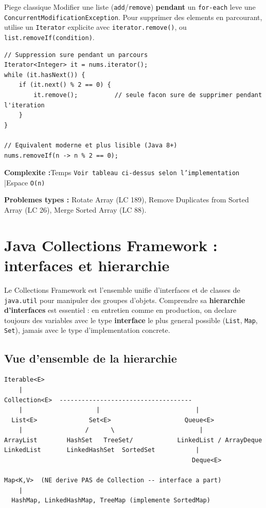 \documentclass[11pt,a4paper]{article}
\newcommand{\complexite}[2]{%
  \noindent\textbf{Complexite :}\quad Temps \texttt{#1} \quad|\quad Espace \texttt{#2}\par\smallskip}
\newcommand{\leetcode}[1]{\noindent\textbf{Problemes types :} #1\par\medskip}
\begin{document}
\begin{infobox}{Piege classique}
Modifier une liste (\texttt{add}/\texttt{remove}) \textbf{pendant} un
\texttt{for-each} leve une \texttt{ConcurrentModificationException}. Pour
supprimer des elements en parcourant, utilise un \texttt{Iterator} explicite
avec \texttt{iterator.remove()}, ou \texttt{list.removeIf(condition)}.
\end{infobox}

\begin{lstlisting}
// Suppression sure pendant un parcours
Iterator<Integer> it = nums.iterator();
while (it.hasNext()) {
    if (it.next() % 2 == 0) {
        it.remove();          // seule facon sure de supprimer pendant l'iteration
    }
}

// Equivalent moderne et plus lisible (Java 8+)
nums.removeIf(n -> n % 2 == 0);
\end{lstlisting}

\complexite{Voir tableau ci-dessus selon l'implementation}{O(n)}
\leetcode{Rotate Array (LC 189), Remove Duplicates from Sorted Array (LC 26), Merge Sorted Array (LC 88).}

\newpage
\section{Java Collections Framework : interfaces et hierarchie}

Le Collections Framework est l'ensemble unifie d'interfaces et de classes de
\texttt{java.util} pour manipuler des groupes d'objets. Comprendre sa
\textbf{hierarchie d'interfaces} est essentiel : en entretien comme en
production, on declare toujours des variables avec le type \textbf{interface}
le plus general possible (\texttt{List}, \texttt{Map}, \texttt{Set}), jamais
avec le type d'implementation concrete.

\subsection{Vue d'ensemble de la hierarchie}

\begin{lstlisting}
Iterable<E>
    |
Collection<E>  ------------------------------------
    |                    |                          |
  List<E>              Set<E>                    Queue<E>
    |                 /      \                       |
ArrayList        HashSet   TreeSet/            LinkedList / ArrayDeque
LinkedList       LinkedHashSet  SortedSet           |
                                                   Deque<E>

Map<K,V>  (NE derive PAS de Collection -- interface a part)
    |
  HashMap, LinkedHashMap, TreeMap (implemente SortedMap)
\end{lstlisting}
\end{document}
